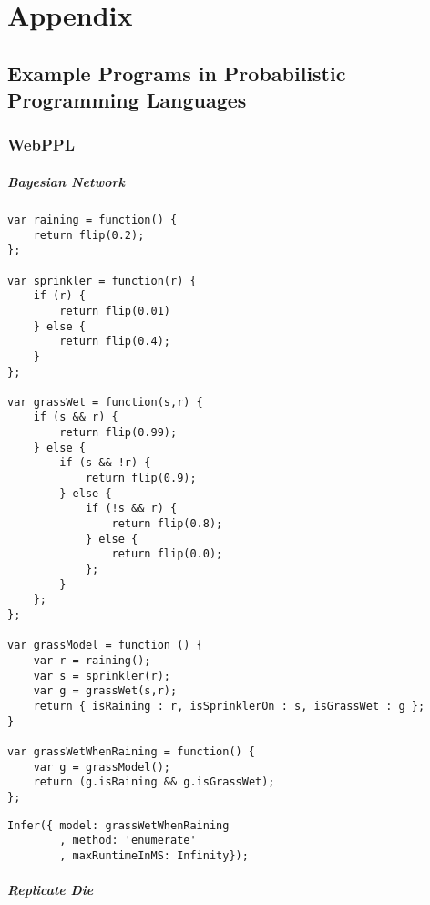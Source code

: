 \chapter{Appendix}
\label{sec:appendix}

\Blindtext[1][1]

\section{Example Programs in Probabilistic Programming Languages}
\label{sec:appendix:ppl}

\subsection{WebPPL}

\paragraph{Bayesian Network}
\begin{verbatim}
var raining = function() {
    return flip(0.2);
};

var sprinkler = function(r) {
    if (r) {
        return flip(0.01)
    } else {
        return flip(0.4);
    }
};

var grassWet = function(s,r) {
    if (s && r) {
        return flip(0.99);
    } else {
        if (s && !r) {
            return flip(0.9);
        } else {
            if (!s && r) {
                return flip(0.8);
            } else {
                return flip(0.0);
            };
        }
    };
};

var grassModel = function () {
    var r = raining();
    var s = sprinkler(r);
    var g = grassWet(s,r);
    return { isRaining : r, isSprinklerOn : s, isGrassWet : g };
}

var grassWetWhenRaining = function() {
    var g = grassModel();
    return (g.isRaining && g.isGrassWet);
};

\end{verbatim}

\begin{verbatim}
Infer({ model: grassWetWhenRaining
        , method: 'enumerate'
        , maxRuntimeInMS: Infinity});
\end{verbatim}

\paragraph{Replicate Die}

